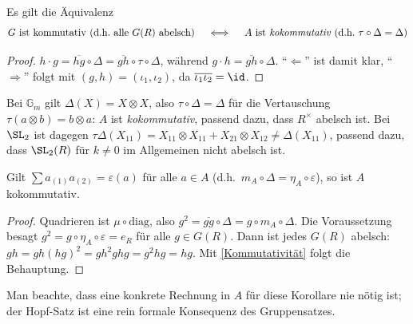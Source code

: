 \documentclass[11pt]{article}
\begin{document}
\begin{corollary}[Kommutativität] \Theorem 
    Es gilt die Äquivalenz
    $$\text{$G$ ist kommutativ (d.h.\ alle $G(R)$ abelsch)} \quad \iff \quad \text{$A$ ist \emph{kokommutativ} (d.h.\ $\tau\circ\Delta=\Delta$)}$$
\end{corollary}
\begin{proof}
    $h\cdot g = \overline{hg}\circ\Delta = \overline{gh}\circ\tau\circ\Delta$, während $g\cdot h = \overline{gh}\circ\Delta$.
    "`$\Leftarrow$"' ist damit klar, "`$\Rightarrow$"' folgt mit $(g,h)=(\iota_1,\iota_2)$, da $\overline{\iota_1\iota_2}=\id$.
\end{proof}

\begin{note}
    Bei $\mathbb{G}_m$ gilt $\Delta(X) = X\otimes X$, also $\tau\circ\Delta = \Delta$ für die Vertauschung $\tau(a\otimes b) = b\otimes a$:
    $A$ ist \emph{kokommutativ}, passend dazu, dass $R^\times$ abelsch ist. Bei $\SL_2$ ist dagegen
    $\tau\Delta(X_{11}) = X_{11}\otimes X_{11} + X_{21}\otimes X_{12} \neq \Delta(X_{11})$, passend dazu, dass $\SL_2(R)$ für $k\neq 0$ im Allgemeinen nicht abelsch ist.
\end{note}

\begin{corollary}[Quadrieren] \Theorem
    Gilt $\sum a_{(1)}a_{(2)} = \varepsilon(a)$ für alle $a\in A$ (d.h.\ $m_A\circ\Delta = \eta_A\circ\varepsilon$), so ist $A$ kokommutativ.
\end{corollary}
\begin{proof}
    Quadrieren ist $\mu\circ\mathrm{diag}$, also $g^2 = \overline{gg}\circ\Delta = g\circ m_A\circ\Delta$. Die Voraussetzung besagt
    $g^2 = g\circ\eta_A\circ\varepsilon = e_R$ für alle $g\in G(R)$. Dann ist jedes $G(R)$ abelsch:
    $gh = gh(hg)^2 = gh^2ghg = g^2hg = hg$. Mit \ref{Kommutativität} folgt die Behauptung.
\end{proof}
\begin{note} Man beachte, dass eine konkrete Rechnung in $A$ für diese Korollare nie nötig ist; der Hopf-Satz ist eine rein formale Konsequenz des Gruppensatzes.
\end{note}
\end{document}
